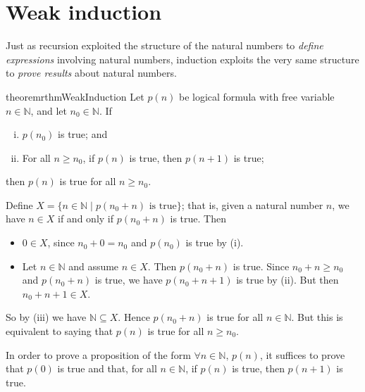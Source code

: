 \section{Weak induction}

Just as recursion exploited the structure of the natural numbers to \textit{define expressions} involving natural numbers, induction exploits the very same structure to \textit{prove results} about natural numbers.

\begin{restatable}{theorem}{rthmWeakInduction}
\label{thmWeakInduction}
Let $p(n)$ be logical formula with free variable $n \in \mathbb{N}$, and let $n_0 \in \mathbb{N}$. If
\begin{enumerate}[(i)] 
\item $p(n_0)$ is true; and
\item For all $n \ge n_0$, if $p(n)$ is true, then $p(n+1)$ is true;
\end{enumerate}
then $p(n)$ is true for all $n \ge n_0$.
\end{restatable}

\begin{cproof}
Define $X = \{ n \in \mathbb{N} \mid p(n_0 + n) \text{ is true} \}$; that is, given a natural number $n$, we have $n \in X$ if and only if $p(n_0 + n)$ is true. Then
\begin{itemize}
\item $0 \in X$, since $n_0 + 0 = n_0$ and $p(n_0)$ is true by (i).
\item Let $n \in \mathbb{N}$ and assume $n \in X$. Then $p(n_0+n)$ is true. Since $n_0 + n \ge n_0$ and $p(n_0+n)$ is true, we have $p(n_0+n+1)$ is true by (ii). But then $n_0+n+1 \in X$.
\end{itemize}

So by (iii) we have $\mathbb{N} \subseteq X$. Hence $p(n_0 + n)$ is true for all $n \in \mathbb{N}$. But this is equivalent to saying that $p(n)$ is true for all $n \ge n_0$.
\end{cproof}

\begin{strategy}
In order to prove a proposition of the form $\forall n \in \mathbb{N},\, p(n)$, it suffices to prove that $p(0)$ is true and that, for all $n \in \mathbb{N}$, if $p(n)$ is true, then $p(n+1)$ is true.
\end{strategy}

